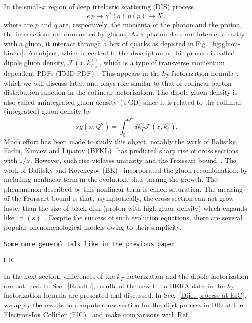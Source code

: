 \documentclass[11pt]{article}
\numberwithin{equation}{section}
\numberwithin{table}{section}
\numberwithin{figure}{section}
\newcommand{\comment}[1]{\texttt{\color{red}#1}}
\begin{document}
In the small-$x$ region of deep intelastic scattering (DIS) process   
%
\begin{equation}
  e\, p\rightarrow \gamma^* (q)\, p(p)\rightarrow X\,,
\end{equation}
%
where are $p$ and $q$ are, respectively, the momenta of the photon and the
proton, the interactions are dominated by gluons\cite{Kovchegov:2012mbw}. As a photon does not interact directly with a gluon, it interact through a box of quarks as depicted in Fig.~\ref{fig:gluon-kinem}. 
An object, which is central to the description of this process is called dipole gluon density, $\mathcal{F}(x,k_T^2)$, which is a type of transverse momentum dependent PDFs (TMD PDF)~\cite{Dominguez:2010xd,Dominguez:2011wm,Xiao:2017yya}. This appears in the $k_T$-factorization formula~\cite{Dominguez:2010xd,Dominguez:2011wm,Xiao:2017yya}, which we will discuss later, and plays role similar to that of collinear parton distribution function in the collinear factorization.
The dipole gluon density is also called unintegrated gluon density~(UGD) since it is related to the collinear (integrated) gluon density by
\begin{equation}
xg(x,Q^2)=\int^{Q^2}_0 dk_T^2 \mathcal{F}(x,k^2_t).
\end{equation}
Much effort has been made to study this object, notably the work of Balistky, Fadin, Kuraev and Lipatov (BFKL)~\cite{Balitsky:1978ic, Kuraev:1977fs} has predicted sharp rise of cross sections with $1/x$.  However, such rise violates unitarity and the Froissart bound~\cite{Kovchegov:2012mbw,Barone:1993sy}. The work of Balitsky and Kovchegov (BK)~\cite{Balitsky:1995ub,Kovchegov:1999yj} incorporated the gluon recombination, by including nonlinear term in the evolution, thus taming the growth. The phenomenon described by this nonlinear term is called saturation. The meaning of the Froissart bound is that, asymptotically, the cross section can not grow faster than the size of black-disk (proton with high gluon density) which expands like $\ln(s)$~\cite{Badelek:1992gs}.
Despite the success of such evolution equations, there are several popular phenomenological models owing to their simplicity. 

\comment{Some more general talk like in the previous paper}

\comment{EIC}

In the next section, differences of the $k_T$-factorization and the dipole-factorization are outlined.  In Sec.~\ref{Results}, results of the new fit to HERA data in the $k_T$-factorization formula are presented and discussed. In Sec.~\ref{Dijet process at EIC}, we apply the results to compute cross section for the dijet process in DIS at the Electron-Ion Collider (EIC)~\cite{NAP25171} and make comparisons with Ref.~\cite{vanHameren:2021sqc}.\\
\end{document}
